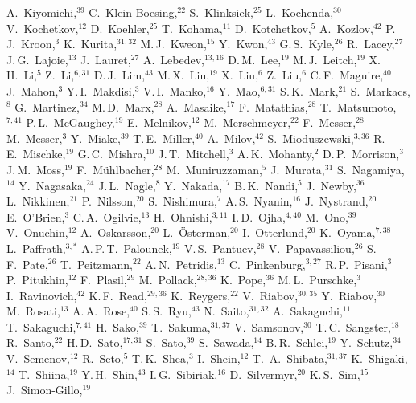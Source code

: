 {A.~Kiyomichi,$^{39}$
C.~Klein-Boesing,$^{22}$
S.~Klinksiek,$^{25}$
L.~Kochenda,$^{30}$
V.~Kochetkov,$^{12}$
D.~Koehler,$^{25}$
T.~Kohama,$^{11}$
D.~Kotchetkov,$^{5}$
A.~Kozlov,$^{42}$
P.{\,}J.~Kroon,$^{3}$
K.~Kurita,$^{31,32}$
M.{\,}J.~Kweon,$^{15}$
Y.~Kwon,$^{43}$
G.{\,}S.~Kyle,$^{26}$
R.~Lacey,$^{27}$
J.{\,}G.~Lajoie,$^{13}$
J.~Lauret,$^{27}$
A.~Lebedev,$^{13,16}$
D.{\,}M.~Lee,$^{19}$
M.{\,}J.~Leitch,$^{19}$
X.{\,}H.~Li,$^{5}$
Z.~Li,$^{6,31}$
D.{\,}J.~Lim,$^{43}$
M.{\,}X.~Liu,$^{19}$
X.~Liu,$^{6}$
Z.~Liu,$^{6}$
C.{\,}F.~Maguire,$^{40}$
J.~Mahon,$^{3}$
Y.{\,}I.~Makdisi,$^{3}$
V.{\,}I.~Manko,$^{16}$
Y.~Mao,$^{6,31}$
S.{\,}K.~Mark,$^{21}$
S.~Markacs,$^{8}$
G.~Martinez,$^{34}$
M.{\,}D.~Marx,$^{28}$
A.~Masaike,$^{17}$
F.~Matathias,$^{28}$
T.~Matsumoto,$^{7,41}$
P.{\,}L.~McGaughey,$^{19}$
E.~Melnikov,$^{12}$
M.~Merschmeyer,$^{22}$
F.~Messer,$^{28}$
M.~Messer,$^{3}$
Y.~Miake,$^{39}$
T.{\,}E.~Miller,$^{40}$
A.~Milov,$^{42}$
S.~Mioduszewski,$^{3,36}$
R.{\,}E.~Mischke,$^{19}$
G.{\,}C.~Mishra,$^{10}$
J.{\,}T.~Mitchell,$^{3}$
A.{\,}K.~Mohanty,$^{2}$
D.{\,}P.~Morrison,$^{3}$
J.{\,}M.~Moss,$^{19}$
F.~M{\"u}hlbacher,$^{28}$
M.~Muniruzzaman,$^{5}$
J.~Murata,$^{31}$
S.~Nagamiya,$^{14}$
Y.~Nagasaka,$^{24}$
J.{\,}L.~Nagle,$^{8}$
Y.~Nakada,$^{17}$
B.{\,}K.~Nandi,$^{5}$
J.~Newby,$^{36}$
L.~Nikkinen,$^{21}$
P.~Nilsson,$^{20}$
S.~Nishimura,$^{7}$
A.{\,}S.~Nyanin,$^{16}$
J.~Nystrand,$^{20}$
E.~O'Brien,$^{3}$
C.{\,}A.~Ogilvie,$^{13}$
H.~Ohnishi,$^{3,11}$
I.{\,}D.~Ojha,$^{4,40}$
M.~Ono,$^{39}$
V.~Onuchin,$^{12}$
A.~Oskarsson,$^{20}$
L.~{\"O}sterman,$^{20}$
I.~Otterlund,$^{20}$
K.~Oyama,$^{7,38}$
L.~Paffrath,$^{3,{\ast}}$
A.{\,}P.{\,}T.~Palounek,$^{19}$
V.{\,}S.~Pantuev,$^{28}$
V.~Papavassiliou,$^{26}$
S.{\,}F.~Pate,$^{26}$
T.~Peitzmann,$^{22}$
A.{\,}N.~Petridis,$^{13}$
C.~Pinkenburg,$^{3,27}$
R.{\,}P.~Pisani,$^{3}$
P.~Pitukhin,$^{12}$
F.~Plasil,$^{29}$
M.~Pollack,$^{28,36}$
K.~Pope,$^{36}$
M.{\,}L.~Purschke,$^{3}$
I.~Ravinovich,$^{42}$
K.{\,}F.~Read,$^{29,36}$
K.~Reygers,$^{22}$
V.~Riabov,$^{30,35}$
Y.~Riabov,$^{30}$
M.~Rosati,$^{13}$
A.{\,}A.~Rose,$^{40}$
S.{\,}S.~Ryu,$^{43}$
N.~Saito,$^{31,32}$
A.~Sakaguchi,$^{11}$
T.~Sakaguchi,$^{7,41}$
H.~Sako,$^{39}$
T.~Sakuma,$^{31,37}$
V.~Samsonov,$^{30}$
T.{\,}C.~Sangster,$^{18}$
R.~Santo,$^{22}$
H.{\,}D.~Sato,$^{17,31}$
S.~Sato,$^{39}$
S.~Sawada,$^{14}$
B.{\,}R.~Schlei,$^{19}$
Y.~Schutz,$^{34}$
V.~Semenov,$^{12}$
R.~Seto,$^{5}$
T.{\,}K.~Shea,$^{3}$
I.~Shein,$^{12}$
T.{\,}-A.~Shibata,$^{31,37}$
K.~Shigaki,$^{14}$
T.~Shiina,$^{19}$
Y.{\,}H.~Shin,$^{43}$
I.{\,}G.~Sibiriak,$^{16}$
D.~Silvermyr,$^{20}$
K.{\,}S.~Sim,$^{15}$
J.~Simon-Gillo,$^{19}$
}
